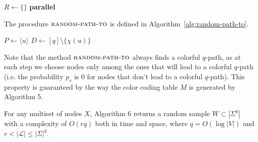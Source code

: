 \begin{algorithm}[h]
	\small
	\DontPrintSemicolon
	\BlankLine
	$R \gets \{\}$\;
	\BlankLine
	\textbf{parallel} 
	\BlankLine
	\BlankLine
	\caption{$\textsc{colorful-sampler}$}
	\label{alg:colorful-sampler}
\end{algorithm}

The procedure $\textsc{random-path-to}$ is defined in Algorithm~\ref{alg:random-path-to}.

\begin{algorithm}[h]
	\small
	\DontPrintSemicolon
	$P\gets \langle u \rangle$\;
	$D\gets [q] \setminus \{\chi(u)\}$\;
	\caption{$\textsc{random-path-to}$}
	\label{alg:random-path-to}
\end{algorithm}

Note that the method $\textsc{random-path-to}$ always finds a colorful $q$-path, as at each step we choose nodes only among the ones that will lead to a colorful $q$-path (i.e. the probability $p_{v}$ is $0$ for nodes that don't lead to a colorful $q$-path). This property is guaranteed by the way the color coding table $M$ is generated by Algorithm 5.

\begin{lemma}
	For any multiset of nodes $X$, 
	Algorithm 6 returns a random sample $W \subset |\Sigma^{q}|$ with a complexity of $O(rq)$ both in time and space, 
	where $q = O(\log |V|)$ and $r < |\mathcal{L}| \leq |\Sigma|^{q}$.
\end{lemma}

